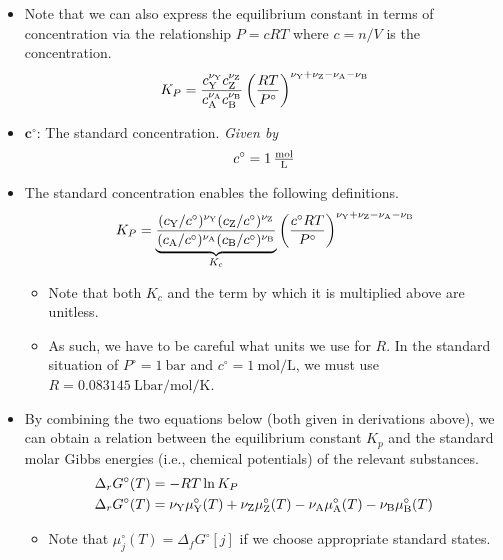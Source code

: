 \documentclass[../notes.tex]{subfiles}
\begin{document}
\begin{itemize}
    \item Note that we can also express the equilibrium constant in terms of concentration via the relationship $P=cRT$ where $c=n/V$ is the concentration.
    \begin{equation*}
        K_P = \frac{c_{\ce{Y}}^{\nu_{\ce{Y}}}c_{\ce{Z}}^{\nu_{\ce{Z}}}}{c_{\ce{A}}^{\nu_{\ce{A}}}c_{\ce{B}}^{\nu_{\ce{B}}}}\left( \frac{RT}{P^\circ} \right)^{\nu_{\ce{Y}}+\nu_{\ce{Z}}-\nu_{\ce{A}}-\nu_{\ce{B}}}
    \end{equation*}
    \item $\bm{c^\circ}$: The standard concentration. \emph{Given by}
    \begin{equation*}
        c^\circ = \SI[per-mode=fraction,fraction-function=\tfrac]{1}{\mole\per\liter}
    \end{equation*}
    \item The standard concentration enables the following definitions.
    \begin{equation*}
        K_P = \underbrace{\frac{(c_{\ce{Y}}/c^\circ)^{\nu_{\ce{Y}}}(c_{\ce{Z}}/c^\circ)^{\nu_{\ce{Z}}}}{(c_{\ce{A}}/c^\circ)^{\nu_{\ce{A}}}(c_{\ce{B}}/c^\circ)^{\nu_{\ce{B}}}}}_{K_c}\left( \frac{c^\circ RT}{P^\circ} \right)^{\nu_{\ce{Y}}+\nu_{\ce{Z}}-\nu_{\ce{A}}-\nu_{\ce{B}}}
    \end{equation*}
    \begin{itemize}
        \item Note that both $K_c$ and the term by which it is multiplied above are unitless.
        \item As such, we have to be careful what units we use for $R$. In the standard situation of $P^\circ=\SI{1}{\bar}$ and $c^\circ=\SI{1}{\mole\per\liter}$, we must use $R=\SI{0.083145}{\liter\bar\per\mole\per\kelvin}$.
    \end{itemize}
    \item By combining the two equations below (both given in derivations above), we can obtain a relation between the equilibrium constant $K_p$ and the standard molar Gibbs energies (i.e., chemical potentials) of the relevant substances.
    \begin{align*}
        \Delta_rG^\circ(T) &= -RT\ln K_P\\
        \Delta_rG^\circ(T) &= \nu_{\ce{Y}}\mu_{\ce{Y}}^\circ(T)+\nu_{\ce{Z}}\mu_{\ce{Z}}^\circ(T)-\nu_{\ce{A}}\mu_{\ce{A}}^\circ(T)-\nu_{\ce{B}}\mu_{\ce{B}}^\circ(T)
    \end{align*}
    \begin{itemize}
        \item Note that $\mu_j^\circ(T)=\Delta_fG^\circ[j]$ if we choose appropriate standard states.

\end{itemize}
\end{itemize}
\end{document}

